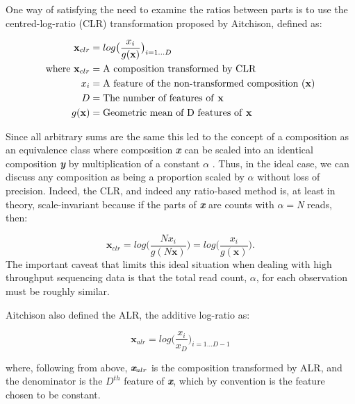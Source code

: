 \documentclass[10pt]{article}
\begin{document}
One way of satisfying the need to examine the ratios between parts is to use the centred-log-ratio (CLR) transformation proposed by Aitchison, defined as: 

\begin{equation}
\begin{split}
\textbf{x}_{clr} &= log  \big( \frac{x_i}{g(\textbf{x})}   \big)_{i=1\dots D} \\
\text{where}~
	\textbf{x}_{clr} &= \text{A composition transformed by CLR} \\
	x_i &= \text{A feature of the non-transformed composition (\textbf{x})} \\
	D &= \text{The number of features of \textbf{x}} \\ 
	g(\textbf{x}) &= \text{Geometric mean of D features of \textbf{x}}
\end{split}
\label{eq:CLR}
\end{equation}

Since all arbitrary sums are the same this led to the concept of a composition as an equivalence class where composition \textit{\bf{x}} can be scaled into an identical composition \textit{\textbf{y}} by multiplication of a constant $\alpha$ . Thus, in the ideal case, we can discuss any composition as being a proportion scaled by $\alpha$ without loss of precision. Indeed, the CLR, and indeed any ratio-based method is, at least in theory, scale-invariant because if the parts of \textit{\textbf{x}} are counts with $\alpha=$\textit{N} reads, then: 

\begin{equation}
	\textbf{x}_{clr}= log\big( \frac{Nx_i}{g(N\textbf{x})}   \big) =  log\big( \frac{x_i}{g(\textbf{x})}  \big).
\label{eq:equip}
\end{equation}
The  important caveat that limits this ideal situation when dealing with high throughput sequencing data is that the total read count, $\alpha$, for each observation must be roughly similar.

Aitchison \citeyear{Aitchison:1986} also defined the ALR, the additive log-ratio as: 

\begin{equation}
\textbf{x}_{alr} = log  \big( \frac{x_i}{x_D}   \big)_{i=1\dots D-1}
\label{eq:ALR}
\end{equation}

where, following from above, $\textit{\textbf{x}}_{alr}$ is the composition transformed by ALR, and the denominator is the $D^{th}$ feature of \textit{\textbf{x}}, which by convention is the feature chosen to be constant.  
\end{document}
